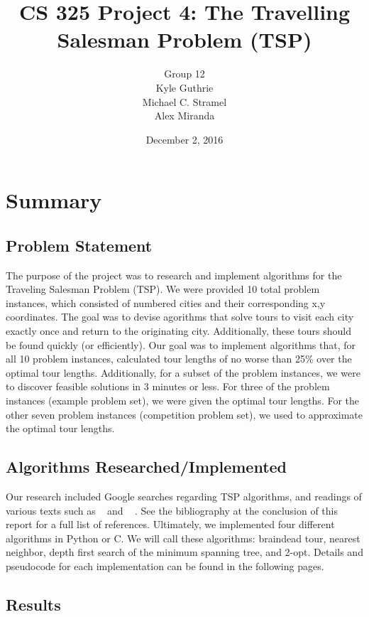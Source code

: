 \documentclass[12pt]{article}
\title{CS 325 Project 4: The Travelling Salesman Problem (TSP)}
\author{Group 12\\
         Kyle Guthrie \\
         Michael C. Stramel \\
         Alex Miranda
}
\date{December 2, 2016}
\begin{document}
\maketitle

\newpage
\section*{Summary}
\subsection*{Problem Statement}

The purpose of the project was to research and implement algorithms for the Traveling Salesman Problem (TSP). We were provided 10 total problem instances, which consisted of numbered cities and their corresponding x,y coordinates. The goal was to devise agorithms that solve tours to visit each city exactly once and return to the originating city. Additionally, these tours should be found quickly (or efficiently). Our goal was to implement algorithms that, for all 10 problem instances, calculated tour lengths of no worse than 25\% over the optimal tour lengths.  Additionally, for a subset of the problem instances, we were to discover feasible solutions in 3 minutes or less.  For three of the problem instances (example problem set), we were given the optimal tour lengths.  For the other seven problem instances (competition problem set), we used \cite{concorde} to approximate the optimal tour lengths.

\subsection*{Algorithms Researched/Implemented}

Our research included Google searches regarding TSP algorithms, and readings of various texts such as ~\cite{cormen2009} and ~\cite{skiena2008} .  See the bibliography at the conclusion of this report for a full list of references.  Ultimately, we implemented four different algorithms in Python or C.  We will call these algorithms: braindead tour, nearest neighbor, depth first search of the minimum spanning tree, and 2-opt.  Details and pseudocode for each implementation can be found in the following pages.

\subsection*{Results}
\end{document}
